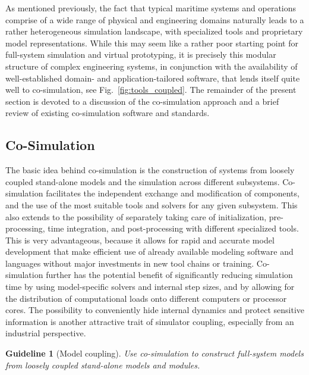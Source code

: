 \documentclass[prb,aps,showpacs,floatfix,twocolumn,10pt]{revtex4-1}
\newcommand{\guidelineCosim}{%
	Use co-simulation to construct full-system models from loosely coupled stand-alone models and modules.
}
\theoremstyle{plain}
\newtheorem{guideline}{Guideline}
\theoremstyle{remark}
\begin{document}
As mentioned previously, the fact that typical maritime systems and operations comprise of a wide range of physical and engineering domains naturally leads to a rather heterogeneous simulation landscape, with specialized tools and proprietary model representations.
While this may seem like a rather poor starting point for full-system simulation and virtual prototyping, it is precisely this modular structure of complex engineering systems, in conjunction with the availability of well-established domain- and application-tailored software, that lends itself quite well to co-simulation, see Fig.~\ref{fig:tools_coupled}.
The remainder of the present section is devoted to a discussion of the co-simulation approach and a brief review of existing co-simulation software and standards.


\subsection{Co-Simulation}
\label{subsec:cosimulation:cosimulation}

The basic idea behind co-simulation is the construction of systems from loosely coupled stand-alone models and the simulation across different subsystems.
Co-simulation facilitates the independent exchange and modification of components, and the use of the most suitable tools and solvers for any given subsystem.
This also extends to the possibility of separately taking care of initialization, pre-processing, time integration, and post-processing with different specialized tools.
This is very advantageous, because it allows for rapid and accurate model development that make efficient use of already available modeling software and languages without major investments in new tool chains or training.
Co-simulation further has the potential benefit of significantly reducing simulation time by using model-specific solvers and internal step sizes, and by allowing for the distribution of computational loads onto different computers or processor cores.
The possibility to conveniently hide internal dynamics and protect sensitive information is another attractive trait of simulator coupling, especially from an industrial perspective.

\begin{guideline}[Model coupling]
\label{guideline:Cosim}
	\guidelineCosim{}
\end{guideline}
\end{document}
